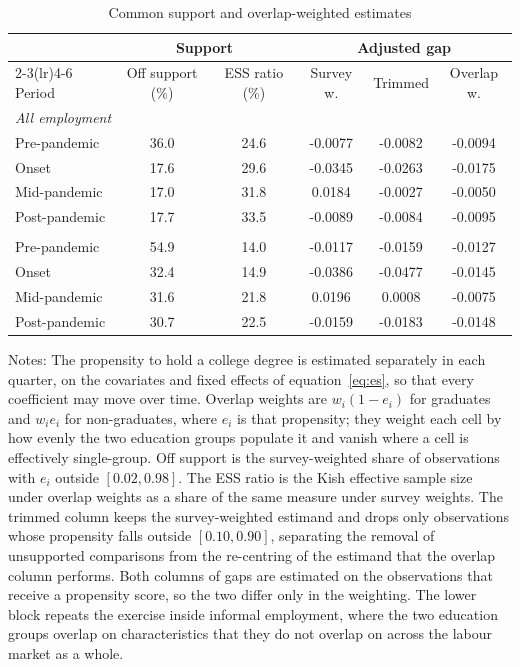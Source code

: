\begin{table}[H]
\centering
\caption{Common support and overlap-weighted estimates}
\label{tab:overlap}
\begin{threeparttable}
\begin{tabular}{lccccc}
\toprule
& \multicolumn{2}{c}{Support} & \multicolumn{3}{c}{Adjusted gap} \\
\cmidrule(lr){2-3}\cmidrule(lr){4-6}
Period & Off support (\%) & ESS ratio (\%) & Survey w. & Trimmed & Overlap w. \\
\midrule
\multicolumn{6}{l}{\textit{All employment}} \\
\quad Pre-pandemic & 36.0 & 24.6 & -0.0077 & -0.0082 & -0.0094 \\
\quad Onset & 17.6 & 29.6 & -0.0345 & -0.0263 & -0.0175 \\
\quad Mid-pandemic & 17.0 & 31.8 & 0.0184 & -0.0027 & -0.0050 \\
\quad Post-pandemic & 17.7 & 33.5 & -0.0089 & -0.0084 & -0.0095 \\
\addlinespace
\multicolumn{6}{l}{\textit{Informal employment}} \\
\quad Pre-pandemic & 54.9 & 14.0 & -0.0117 & -0.0159 & -0.0127 \\
\quad Onset & 32.4 & 14.9 & -0.0386 & -0.0477 & -0.0145 \\
\quad Mid-pandemic & 31.6 & 21.8 & 0.0196 & 0.0008 & -0.0075 \\
\quad Post-pandemic & 30.7 & 22.5 & -0.0159 & -0.0183 & -0.0148 \\
\bottomrule
\end{tabular}
\begin{tablenotes}[flushleft]\footnotesize
\item Notes: The propensity to hold a college degree is estimated separately in each quarter, on the covariates and fixed effects of equation~\eqref{eq:es}, so that every coefficient may move over time. Overlap weights are $w_i(1-e_i)$ for graduates and $w_i e_i$ for non-graduates, where $e_i$ is that propensity; they weight each cell by how evenly the two education groups populate it and vanish where a cell is effectively single-group. Off support is the survey-weighted share of observations with $e_i$ outside $[0.02, 0.98]$. The ESS ratio is the Kish effective sample size under overlap weights as a share of the same measure under survey weights. The trimmed column keeps the survey-weighted estimand and drops only observations whose propensity falls outside $[0.10, 0.90]$, separating the removal of unsupported comparisons from the re-centring of the estimand that the overlap column performs. Both columns of gaps are estimated on the observations that receive a propensity score, so the two differ only in the weighting. The lower block repeats the exercise inside informal employment, where the two education groups overlap on characteristics that they do not overlap on across the labour market as a whole.
\end{tablenotes}
\end{threeparttable}
\end{table}
